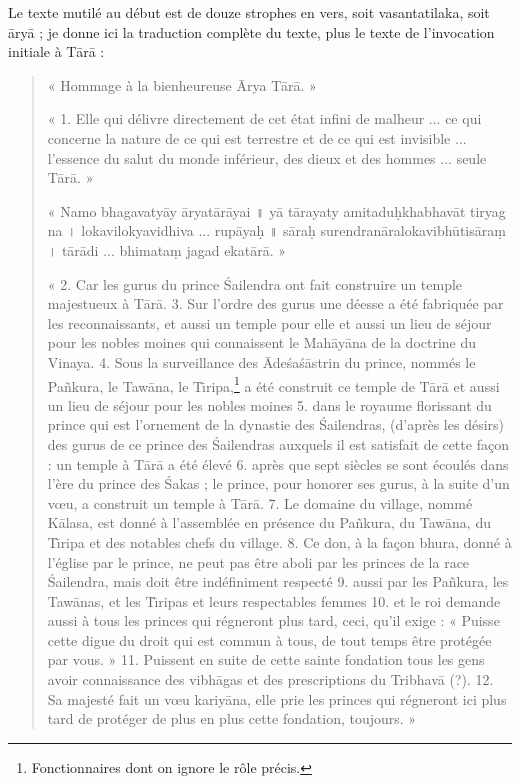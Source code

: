 \documentclass[a4paper, 11pt, oneside, french, landscape, twocolumn]{article}
\begin{document}
Le texte mutilé au début est de douze strophes en vers, soit vasantatilaka, soit \={a}ry\={a} ; je donne ici la traduction complète du texte, plus le texte de l'invocation initiale à T\={a}r\={a} :
\begin{quotation}\footnotesize
« Hommage à la bienheureuse \={A}rya T\={a}r\={a}. »

\bigskip

« 1. Elle qui délivre directement de cet état infini de malheur ... ce qui concerne la nature de ce qui est terrestre et de ce qui est invisible ... l'essence du salut du monde inférieur, des dieux et des hommes ... seule T\={a}r\={a}. »

« Namo bhagavaty\={a}y \={a}ryat\={a}r\={a}yai \texthindi{॥} y\={a} t\={a}rayaty amitadu\d{h}khabhav\={a}t tiryag na \texthindi{।} lokavilokyavidhiva ... rup\={a}ya\d{h} \texthindi{॥} s\={a}ra\d{h} surendran\={a}ralokavibh\={u}tis\={a}ra\d{m} \texthindi{।} t\={a}r\={a}di ... bhimata\d{m} jagad ekat\={a}r\={a}. »

\bigskip

« 2. Car les gurus du prince \'{S}ailendra ont fait construire un temple majestueux à T\={a}r\={a}. 3. Sur l'ordre des gurus une déesse a été fabriquée par les reconnaissants, et aussi un temple pour elle et aussi un lieu de séjour pour les nobles moines qui connaissent le Mah\={a}y\={a}na de la doctrine du Vinaya. 4. Sous la surveillance des \={A}de\'{s}a\'{s}\={a}strin du prince, nommés le Pa\~{n}kura, le Taw\={a}na, le T\={\i}ripa,\footnote{Fonctionnaires dont on ignore le rôle précis.} a été construit ce temple de T\={a}r\={a} et aussi un lieu de séjour pour les nobles moines 5. dans le royaume florissant du prince qui est l'ornement de la dynastie des \'{S}ailendras, (d'après les désirs) des gurus de ce prince des \'{S}ailendras auxquels il est satisfait de cette façon : un temple à T\={a}r\={a} a été élevé 6. après que sept siècles se sont écoulés dans l'ère du prince des \'{S}akas ; le prince, pour honorer ses gurus, à la suite d'un vœu, a construit un temple à T\={a}r\={a}. 7. Le domaine du village, nommé K\={a}lasa, est donné à l'assemblée en présence du Pa\~{n}kura, du Taw\={a}na, du T\={\i}ripa et des notables chefs du village. 8. Ce don, à la façon bhura, donné à l'église par le prince, ne peut pas être aboli par les princes de la race \'{S}ailendra, mais doit être indéfiniment respecté 9. aussi par les Pa\~{n}kura, les Taw\={a}nas, et les T\={\i}ripas et leurs respectables femmes 10. et le roi demande aussi à tous les princes qui régneront plus tard, ceci, qu'il exige : « Puisse cette digue du droit qui est commun à tous, de tout temps être protégée par vous. » 11. Puissent en suite de cette sainte fondation tous les gens avoir connaissance des vibh\={a}gas et des prescriptions du Tribhav\={a} (?). 12. Sa majesté fait un vœu kariy\={a}na, elle prie les princes qui régneront ici plus tard de protéger de plus en plus cette fondation, toujours. »
\end{quotation}
\end{document}
